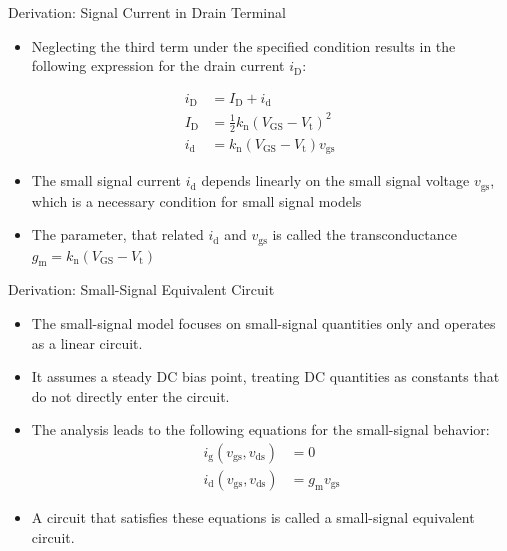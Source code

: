 \begin{frame}{Derivation: Signal Current in Drain Terminal}
    \begin{itemize}
        \item Neglecting the third term under the specified condition results in the following 
        expression for the drain current $i_{\mathrm{D}}$:
    \end{itemize}
    \begin{align*}
            i_{\mathrm{D}}&=I_{\mathrm{D}}+i_{\mathrm{d}} \\
            I_{\mathrm{D}}&=\frac{1}{2}k_{\mathrm{n}}(V_{\mathrm{GS}}-V_{\mathrm{t}})^{2} \\
            i_{\mathrm{d}}&=k_{\mathrm{n}}(V_{\mathrm{GS}}-V_{\mathrm{t}})v_{\mathrm{gs}}
    \end{align*}
    \begin{itemize}
        \item The small signal current $i_{\mathrm{d}}$ depends linearly on the small signal voltage
        $v_{\mathrm{gs}}$, which is a necessary condition for small signal models
        \item The parameter, that related $i_{\mathrm{d}}$ and $v_{\mathrm{gs}}$ is called the 
        transconductance $g_{\mathrm{m}}=k_{\mathrm{n}}(V_{\mathrm{GS}}-V_{\mathrm{t}})$
    \end{itemize} 
\end{frame}

\begin{frame}{Derivation: Small-Signal Equivalent Circuit}
    \begin{itemize}
        \item The small-signal model focuses on small-signal quantities only and operates as a 
        linear circuit.
        \item It assumes a steady DC bias point, treating DC quantities as constants that do not 
        directly enter the circuit.
        \item The analysis leads to the following equations for the small-signal behavior:
        \begin{align*}
            i_{\mathrm{g}}(v_{\mathrm{gs}}, v_{\mathrm{ds}}) &= 0 \\
            i_{\mathrm{d}}(v_{\mathrm{gs}}, v_{\mathrm{ds}}) &= g_{\mathrm{m}}v_{\mathrm{gs}}
        \end{align*}
        \item A circuit that satisfies these equations is called a small-signal equivalent circuit.
    \end{itemize}
\end{frame}

